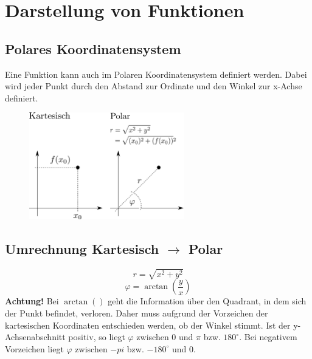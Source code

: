 



\section{Darstellung von Funktionen}
\subsection{Polares Koordinatensystem}
Eine Funktion kann auch im Polaren Koordinatensystem definiert werden. 
Dabei wird jeder Punkt durch den Abstand zur Ordinate und den Winkel zur 
x-Achse definiert. 

\begin{figure}[h!]
\centering
\includegraphics[width=0.6\textwidth]{polar.pdf}
\end{figure}


\subsection{Umrechnung Kartesisch $\rightarrow$ Polar}
\[ \boxed{r = \sqrt{x^2 + y^2}} \]
\[ \boxed{\varphi = \arctan\left(\frac{y}{x}\right)} \]
\textbf{Achtung!} Bei $\arctan()$ geht die Information über den Quadrant, in 
dem sich der Punkt befindet, verloren. Daher muss aufgrund der Vorzeichen der 
kartesischen Koordinaten entschieden werden, ob der Winkel stimmt. Ist der 
y-Achsenabschnitt positiv, so liegt $\varphi$ zwischen $0$ und $\pi$ bzw. 
$180^\circ$. Bei negativem Vorzeichen liegt $\varphi$ zwischen $-pi$ bzw. 
$-180^\circ$ und 0. 

